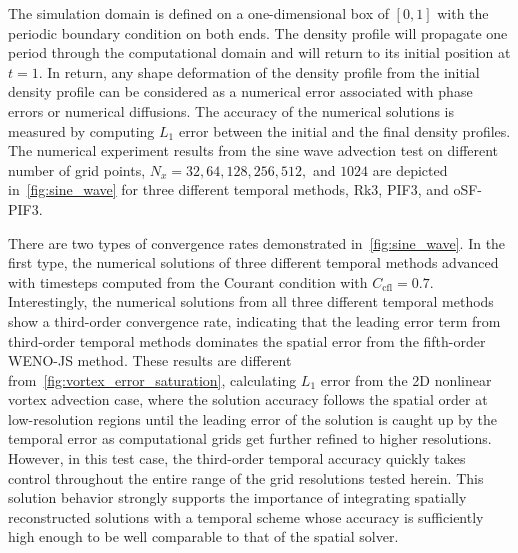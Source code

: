 The simulation domain is defined on a one-dimensional box of \( [0, 1] \)
with the periodic boundary condition on both ends.
The density profile will propagate one period through the computational domain
and will return to its initial position at \( t = 1 \).
In return, any shape deformation of the density profile
from the initial density profile can be considered as a numerical error
associated with phase errors or numerical diffusions.
The accuracy of the numerical solutions is measured by computing \( L_{1} \) error
between the initial and the final density profiles.
The numerical experiment results from the sine wave advection test
on different number of grid points, \( N_{x} = 32, 64, 128, 256, 512, \) and \( 1024 \)
are depicted in~\cref{fig:sine_wave} for three different temporal methods, Rk3, PIF3, and oSF-PIF3.

There are two types of convergence rates demonstrated in~\cref{fig:sine_wave}.
In the first type, the numerical solutions of three different temporal methods
advanced with timesteps computed from the Courant condition with \( C_{\text{cfl}} = 0.7 \).
Interestingly, the numerical solutions from all three different temporal methods
show a third-order convergence rate, indicating that the leading error term from
third-order temporal methods dominates the spatial error from the fifth-order WENO-JS method.
These results are different from~\cref{fig:vortex_error_saturation},
calculating \( L_{1} \) error from the 2D nonlinear vortex advection case,
where the solution accuracy follows the spatial order at low-resolution regions
until the leading error of the solution is caught up by the temporal error
as computational grids get further refined to higher resolutions.
However, in this test case, the third-order temporal accuracy quickly takes control
throughout the entire range of the grid resolutions tested herein.
This solution behavior strongly supports the importance of
integrating spatially reconstructed solutions with a temporal scheme whose accuracy is
sufficiently high enough to be well comparable to that of the spatial solver.

